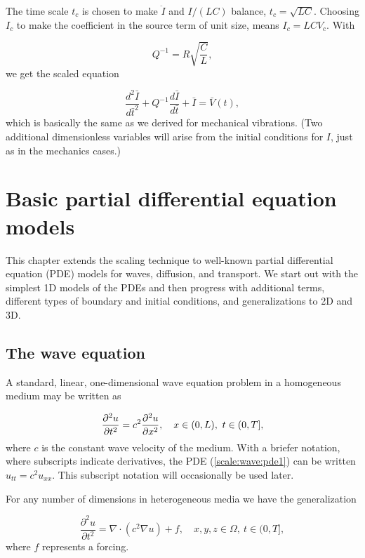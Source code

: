 \documentclass[graybox,envcountchap,sectrefs,final]{svmonodo}
\begin{document}
The time scale $t_c$ is chosen to make $\ddot I$ and $I/(LC)$ balance,
$t_c = \sqrt{LC}$.
Choosing $I_c$ to make the coefficient in the source term of unit size,
means $I_c = LCV_c$.
With

\[ Q^{-1} = R\sqrt{\frac{C}{L}},\]
we get the scaled equation

\begin{equation}
\frac{d^2\bar I}{d\bar t^2} + Q^{-1}\frac{d\bar I}{d\bar t}
+ \bar I = \bar V(t),
\end{equation}
which is basically the same as we derived for mechanical vibrations.
(Two additional dimensionless variables will arise from the initial
conditions for $I$, just as in the mechanics cases.)


\chapter{Basic partial differential equation models}

This chapter extends the scaling technique to well-known partial differential
equation (PDE) models for waves, diffusion, and transport.
We start out with the simplest 1D models of the PDEs and then progress
with additional terms, different types of boundary and initial conditions,
and generalizations to 2D and 3D.

\section{The wave equation}
\label{sec:scale:wave}

A standard, linear, one-dimensional wave equation problem
in a homogeneous medium may be written as

\begin{equation}
\frac{\partial^2 u}{\partial t^2} =
c^2 {\partial^2 u\over\partial x^2}, \quad  x\in (0,L),\ t\in (0,T],
\label{scale:wave:pde1}
\end{equation}
where $c$ is the constant wave velocity of the medium.
With a briefer notation, where subscripts indicate derivatives,
the PDE (\ref{scale:wave:pde1}) can be written
$u_{tt}=c^2u_{xx}$. This subscript notation will occasionally be
used later.

For any number of dimensions in heterogeneous media we have the generalization

\begin{equation}
\frac{\partial^2 u}{\partial t^2} =
\nabla\cdot\left(c^2 \nabla u\right) + f, \quad  x,y,z\in \Omega,\ t\in (0,T],
\label{scale:wave:pde1:3D}
\end{equation}
where $f$ represents a forcing.
\end{document}
